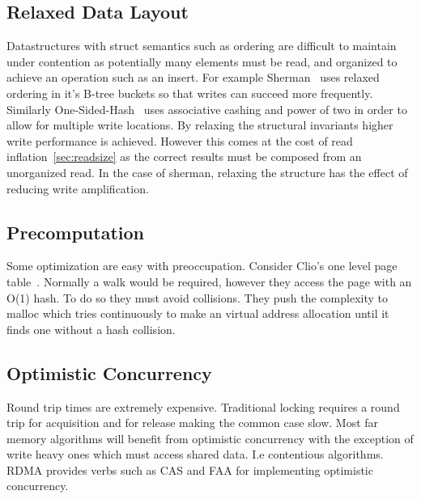 \subsection{Relaxed Data Layout} Datastructures with struct semantics such as
ordering are difficult to maintain under contention as potentially many elements
must be read, and organized to achieve an operation such as an insert. For
example Sherman~\cite{sherman} uses relaxed ordering in it's B-tree buckets so
that writes can succeed more frequently. Similarly
One-Sided-Hash~\cite{one-sided-hash} uses associative cashing and power of two
in order to allow for multiple write locations. By relaxing the structural
invariants higher write performance is achieved. However this comes at the cost
of read inflation~\ref{sec:readsize} as the correct results must be composed
from an unorganized read. In the case of sherman, relaxing the structure has the
effect of reducing write amplification.

\subsection{Precomputation} Some optimization are easy with preoccupation. Consider
Clio's one level page table~\cite{clio}. Normally a walk would be required, however they
access the page with an O(1) hash. To do so they must avoid collisions. They
push the complexity to malloc which tries continuously to make an virtual address
allocation until it finds one without a hash collision.

\subsection{Optimistic Concurrency} Round trip times are extremely expensive.
Traditional locking requires a round trip for acquisition and for release making
the common case slow. Most far memory algorithms will benefit from optimistic
concurrency with the exception of write heavy ones which must access shared
data. I.e contentious algorithms. RDMA provides verbs such as CAS and FAA for
implementing optimistic concurrency.

